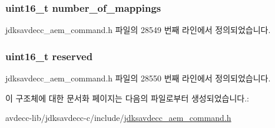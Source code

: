\subsubsection[{\texorpdfstring{number\+\_\+of\+\_\+mappings}{number_of_mappings}}]{\setlength{\rightskip}{0pt plus 5cm}uint16\+\_\+t number\+\_\+of\+\_\+mappings}\hypertarget{structjdksavdecc__aem__command__add__audio__mappings__response_ac7db472c5622ef473d5d0a5c416d5531}{}\label{structjdksavdecc__aem__command__add__audio__mappings__response_ac7db472c5622ef473d5d0a5c416d5531}


jdksavdecc\+\_\+aem\+\_\+command.\+h 파일의 28549 번째 라인에서 정의되었습니다.

\subsubsection[{\texorpdfstring{reserved}{reserved}}]{\setlength{\rightskip}{0pt plus 5cm}uint16\+\_\+t reserved}\hypertarget{structjdksavdecc__aem__command__add__audio__mappings__response_a5a6ed8c04a3db86066924b1a1bf4dad3}{}\label{structjdksavdecc__aem__command__add__audio__mappings__response_a5a6ed8c04a3db86066924b1a1bf4dad3}


jdksavdecc\+\_\+aem\+\_\+command.\+h 파일의 28550 번째 라인에서 정의되었습니다.



이 구조체에 대한 문서화 페이지는 다음의 파일로부터 생성되었습니다.\+:\begin{DoxyCompactItemize}
\item 
avdecc-\/lib/jdksavdecc-\/c/include/\hyperlink{jdksavdecc__aem__command_8h}{jdksavdecc\+\_\+aem\+\_\+command.\+h}\end{DoxyCompactItemize}
